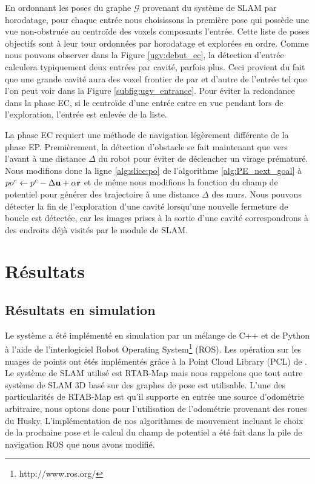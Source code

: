 En ordonnant les poses du graphe $\mathcal G$ provenant du système de SLAM par horodatage, pour chaque entrée nous choisissons la première pose qui possède une vue non-obstruée au centroïde des voxels composants l'entrée. Cette liste de poses objectifs sont à leur tour ordonnées par horodatage et explorées en ordre. Comme nous pouvons observer dans la Figure \ref{ugv:debut_ec}, la détection d'entrée calculera typiquement deux entrées par cavité, parfois plus. Ceci provient du fait que une grande cavité aura des voxel frontier de par et d'autre de l'entrée tel que l'on peut voir dans la Figure \ref{subfig:ugv_entrance}.  Pour éviter la redondance dans la phase EC, si le centroïde d'une entrée entre en vue pendant lors de l'exploration, l'entrée est enlevée de la liste.

La phase EC requiert une méthode de navigation légèrement différente de la phase EP. Premièrement, la détection d'obstacle se fait maintenant que vers l'avant à une distance $\Delta$ du robot pour éviter de déclencher un virage prématuré. Nous modifions donc la ligne \ref{alg:slice:po} de l'algorithme \ref{alg:PE_next_goal} à ${po^c} \gets p^c - \Delta \mathbf{u} + \alpha \mathbf{r}$ et de même nous modifions la fonction du champ de potentiel pour générer des trajectoire à une distance $\Delta$ des murs. Nous pouvons détecter la fin de l'exploration d'une cavité lorsqu'une nouvelle fermeture de boucle est détectée, car les images prises à la sortie d'une cavité correspondrons à des endroits déjà visités par le module de SLAM.

\section{Résultats} \label{sec:ugv_results}

\subsection{Résultats en simulation}

Le système a été implémenté en simulation par un mélange de C++ et de Python à l'aide de l'interlogiciel Robot Operating System\footnote{http://www.ros.org/} (ROS). Les opération sur les nuages de points ont étés implémentés grâce à la Point Cloud Library (PCL) de \citep{Rusu2011}. Le système de SLAM utilisé est RTAB-Map \citep{Labbe2014} mais nous rappelons que tout autre système de SLAM 3D basé sur des graphes de pose est utilisable. L'une des particularités de RTAB-Map est qu'il supporte en entrée une source d'odométrie arbitraire, nous optons donc pour l'utilisation de l'odométrie provenant des roues du Husky. L'implémentation de nos algorithmes de mouvement incluant le choix de la prochaine pose et le calcul du champ de potentiel a été fait dans la pile de navigation ROS \citep{Mader2010} que nous avons modifié.

